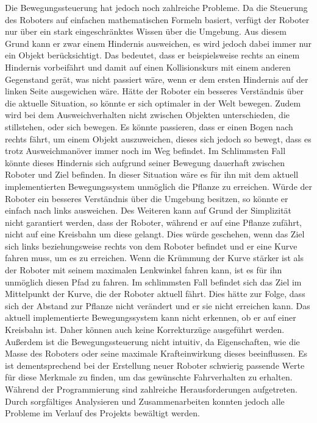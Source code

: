 Die Bewegungssteuerung hat jedoch noch zahlreiche Probleme. Da die Steuerung des Roboters auf einfachen mathematischen Formeln basiert, verfügt der Roboter nur über ein stark eingeschränktes Wissen über die Umgebung. Aus diesem Grund kann er zwar einem Hindernis ausweichen, es wird jedoch dabei immer nur ein Objekt berücksichtigt. Das bedeutet, dass er beispielsweise rechts an einem Hindernis vorbeifährt und damit auf einen Kollisionskurs mit einem anderen Gegenstand gerät, was nicht passiert wäre, wenn er dem ersten Hindernis auf der linken Seite ausgewichen wäre. Hätte der Roboter ein besseres Verständnis über die aktuelle Situation, so könnte er sich optimaler in der Welt bewegen. Zudem wird bei dem Ausweichverhalten nicht zwischen Objekten unterschieden, die stillstehen, oder sich bewegen. Es könnte passieren, dass er einen Bogen nach rechts fährt, um einem Objekt auszuweichen, dieses sich jedoch so bewegt, dass es trotz Ausweichmanöver immer noch im Weg befindet. Im Schlimmsten Fall könnte dieses Hindernis sich aufgrund seiner Bewegung dauerhaft zwischen Roboter und Ziel befinden. In dieser Situation wäre es für ihn mit dem aktuell implementierten Bewegungssystem unmöglich die Pflanze zu erreichen. Würde der Roboter ein besseres Verständnis über die Umgebung besitzen, so könnte er einfach nach links ausweichen.
Des Weiteren kann auf Grund der Simplizität nicht garantiert werden, dass der Roboter, während er auf eine Pflanze zufährt, nicht auf eine Kreisbahn um diese gelangt. Dies würde geschehen, wenn das Ziel sich links beziehungsweise rechts von dem Roboter befindet und er eine Kurve fahren muss, um es zu erreichen. Wenn die Krümmung der Kurve stärker ist als der Roboter mit seinem maximalen Lenkwinkel fahren kann, ist es für ihn unmöglich diesen Pfad zu fahren. Im schlimmsten Fall befindet sich das Ziel im Mittelpunkt der Kurve, die der Roboter aktuell fährt. Dies hätte zur Folge, dass sich der Abstand zur Pflanze nicht verändert und er sie nicht erreichen kann. Das aktuell implementierte Bewegungssystem kann nicht erkennen, ob er auf einer Kreisbahn ist. Daher können auch keine Korrekturzüge ausgeführt werden.
Außerdem ist die Bewegungssteuerung nicht intuitiv, da Eigenschaften, wie die Masse des Roboters oder seine maximale Krafteinwirkung dieses beeinflussen. Es ist dementsprechend bei der Erstellung neuer Roboter schwierig passende Werte für diese Merkmale zu finden, um das gewünschte Fahrverhalten zu erhalten. 
Während der Programmierung sind zahlreiche Herausforderungen aufgetreten. Durch sorgfältiges Analysieren und Zusammenarbeiten konnten jedoch alle Probleme im Verlauf des Projekts bewältigt werden.
